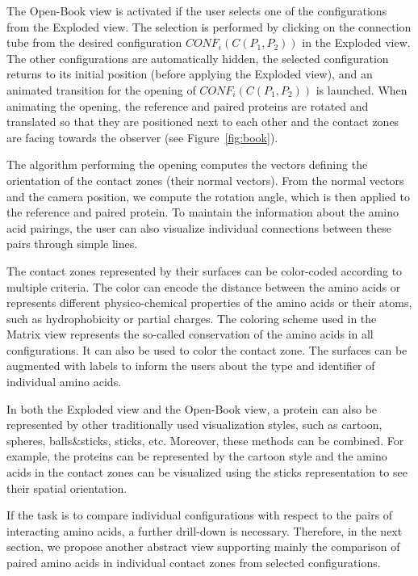 \documentclass{bmcart}
\def\OpBook {Open-Book view\xspace}
\def\ExpView {Exploded view\xspace}
\def\MatView {Matrix view\xspace}
\begin{document}
The \OpBook is activated if the user selects one of the configurations from the \ExpView. 
The selection is performed by clicking on the connection tube from the desired configuration $CONF_i(C(P_1,P_2))$ in the \ExpView.
The other configurations are automatically hidden, the selected configuration returns to its initial position (before applying the \ExpView), and an animated transition for the opening of $CONF_i(C(P_1,P_2))$ is launched.
When animating the opening, the reference and paired proteins are rotated and translated so that they are positioned next to each other and the contact zones are facing towards the observer (see Figure~\ref{fig:book}). 

The algorithm performing the opening computes the vectors defining the orientation of the contact zones (their normal vectors). 
From the normal vectors and the camera position, we compute the rotation angle, which is then applied to the reference and paired protein.
To maintain the information about the amino acid pairings, the user can also visualize individual connections between these pairs through simple lines.


The contact zones represented by their surfaces can be color-coded according to multiple criteria.
The color can encode the distance between the amino acids or represents different physico-chemical properties of the amino acids or their atoms, such as hydrophobicity or partial charges.
The coloring scheme used in the \MatView represents the so-called conservation of the amino acids in all configurations.
It can also be used to color the contact zone.
The surfaces can be augmented with labels to inform the users about the type and identifier of individual amino acids.

In both the \ExpView and the \OpBook, a protein can also be represented by other traditionally used visualization styles, such as cartoon, spheres, balls\&sticks, sticks, etc.
Moreover, these methods can be combined. 
For example, the proteins can be represented by the cartoon style and the amino acids in the contact zones can be visualized using the sticks representation to see their spatial orientation.

If the task is to compare individual configurations with respect to the pairs of interacting amino acids, a further drill-down is necessary.
Therefore, in the next section, we propose another abstract view supporting mainly the comparison of paired amino acids in individual contact zones from selected configurations.

\end{document}

